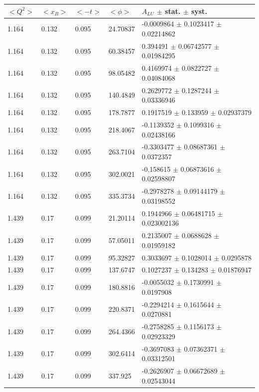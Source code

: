\begin{table}[!h]
   \begin{center}
      \begin{tabular}{||l|l|l|l|l||}
         \hline
 $<Q^{2}>$ & $<x_{B}>$ & $<-t>$ & $<\phi>$ & $A_{LU}$ $\pm$ stat. $\pm$ syst.\\
         \hline
        1.164 & 0.132 & 0.095 &   24.70837  &    -0.0009864  $\pm$   0.1023417     $\pm$   0.02214862    \\
        1.164 & 0.132 & 0.095 &   60.38457  &     0.394491   $\pm$   0.06742577    $\pm$   0.01984295    \\
        1.164 & 0.132 & 0.095 &   98.05482  &     0.4169974  $\pm$   0.0822727     $\pm$   0.04084068    \\
        1.164 & 0.132 & 0.095 &   140.4849  &     0.2629772  $\pm$   0.1287244     $\pm$   0.03336946    \\
        1.164 & 0.132 & 0.095 &   178.7877  &     0.1917519  $\pm$   0.133959      $\pm$   0.02937379    \\
        1.164 & 0.132 & 0.095 &   218.4067  &    -0.1139352  $\pm$   0.1099316     $\pm$   0.02438166    \\
        1.164 & 0.132 & 0.095 &   263.7104  &    -0.3303477  $\pm$   0.08687361    $\pm$   0.0372357     \\
        1.164 & 0.132 & 0.095 &   302.0021  &    -0.158615   $\pm$   0.06873616    $\pm$   0.02598807    \\
        1.164 & 0.132 & 0.095 &   335.3734  &    -0.2978278  $\pm$   0.09144179    $\pm$   0.03198552    \\
         \hline
                                                                         
        1.439 & 0.17 & 0.099 &    21.20114   &    0.1944966  $\pm$   0.06481715    $\pm$   0.023002136   \\
        1.439 & 0.17 & 0.099 &    57.05011   &    0.2135007  $\pm$   0.0688628     $\pm$   0.01959182    \\
        1.439 & 0.17 & 0.099 &    95.32827   &    0.3033697  $\pm$   0.1028014     $\pm$   0.0295878     \\
        1.439 & 0.17 & 0.099 &    137.6747   &    0.1027237  $\pm$   0.134283      $\pm$   0.01876947    \\
        1.439 & 0.17 & 0.099 &    180.8816   &   -0.0055032  $\pm$   0.1730991     $\pm$   0.0197908     \\
        1.439 & 0.17 & 0.099 &    220.8371   &   -0.2294214  $\pm$   0.1615644     $\pm$   0.0270881     \\
        1.439 & 0.17 & 0.099 &    264.4366   &   -0.2758285  $\pm$   0.1156173     $\pm$   0.02923329    \\
        1.439 & 0.17 & 0.099 &    302.6414   &   -0.3697083  $\pm$   0.07362371    $\pm$   0.03312501    \\
        1.439 & 0.17 & 0.099 &    337.925    &   -0.2626907  $\pm$   0.06672689    $\pm$   0.02543044    \\              
         \hline
                                                                         

\end{tabular}
\end{center}
\end{table}
